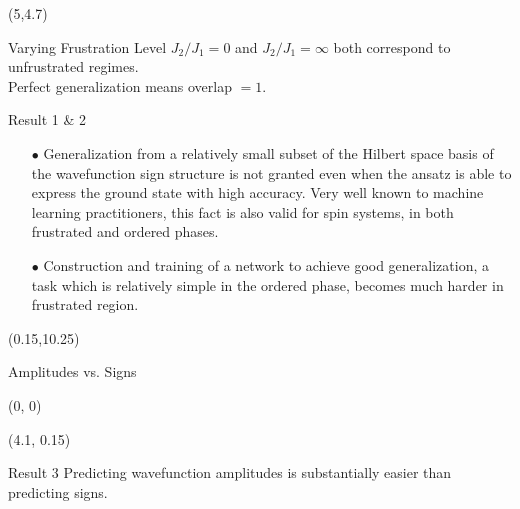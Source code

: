 \documentclass[final]{beamer}
\begin{document}
\begin{textblock}{9.5}(5,4.7)
    \begin{block}{Varying Frustration Level}
        \centering
        $J_2/J_1 \!= \!0$ and $J_2/J_1 \!= \!\infty$ both correspond to unfrustrated regimes. \\
        Perfect generalization means overlap $=1$.

        \begin{figure}[h]
            \centering
            
        \end{figure}
    \end{block}

    \vspace{0.3cm}
    \begin{alertblock}{Result 1 \& 2}
        \begin{itemize}
            \item[$\bullet$] Generalization from a relatively small subset of
                the Hilbert space basis of the wavefunction sign structure is
                not granted even when the ansatz is able to express the ground
                state with high accuracy. Very well known to machine learning
                practitioners, this fact is also valid for spin systems, in both
                frustrated and ordered phases.

            \item[$\bullet$] Construction and training of a network to achieve good generalization,
                a task which is relatively simple in the ordered phase, becomes much harder in
                frustrated region.
        \end{itemize}
    \end{alertblock} 
\end{textblock}

\begin{textblock}{7.3}(0.15,10.25)
    \begin{block}{Amplitudes vs. Signs}
        \begin{textblock}{4.5}(0, 0)
        \begin{figure}[h]
            \vspace{0.5cm}
            \center
            
        \end{figure}
        \end{textblock}

        \begin{textblock}{2.9}(4.1, 0.15)
        \begin{alertblock}{Result 3}
            Predicting wavefunction amplitudes is substantially easier than
            predicting signs.
        \end{alertblock} 
        \end{textblock}
    \end{block}

\end{textblock}
\end{document}
